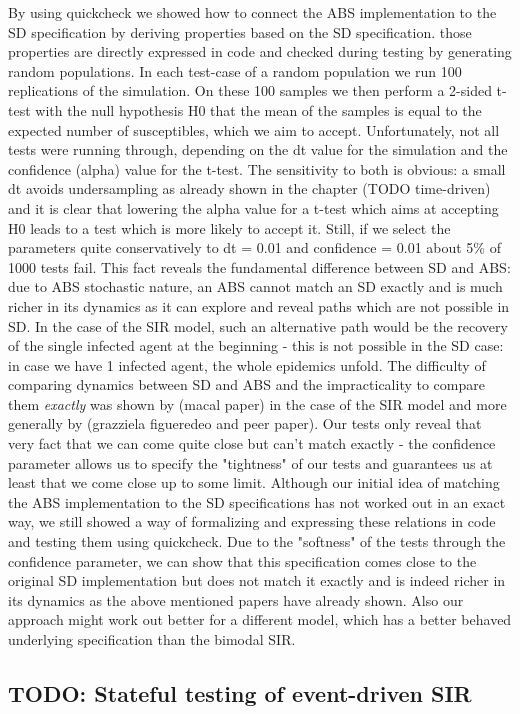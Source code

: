 By using quickcheck we showed how to connect the ABS implementation to the SD specification by deriving properties based on the SD specification. those properties are directly expressed in code and checked during testing by generating random populations. In each test-case of a random population we run 100 replications of the simulation. On these 100 samples we then perform a 2-sided t-test with the null hypothesis H0 that the mean of the samples is equal to the expected number of susceptibles, which we aim to accept.
Unfortunately, not all tests were running through, depending on the dt value for the simulation and the confidence (alpha) value for the t-test. The sensitivity to both is obvious: a small dt avoids undersampling as already shown in the chapter (TODO time-driven) and it is clear that lowering the alpha value for a t-test which aims at accepting H0 leads to a test which is more likely to accept it. Still, if we select the parameters quite conservatively to dt = 0.01 and confidence = 0.01 about 5\% of 1000 tests fail.
This fact reveals the fundamental difference between SD and ABS: due to ABS stochastic nature, an ABS cannot match an SD exactly and is much richer in its dynamics as it can explore and reveal paths which are not possible in SD. In the case of the SIR model, such an alternative path would be the recovery of the single infected agent at the beginning - this is not possible in the SD case: in case we have 1 infected agent, the whole epidemics unfold.
The difficulty of comparing dynamics between SD and ABS and the impracticality to compare them \textit{exactly} was shown by \cite{macal_agent-based_2010} (macal paper) in the case of the SIR model and more generally by \cite{figueredo_comparing_2014} (grazziela figueredeo and peer paper). Our tests only reveal that very fact that we can come quite close but can't match exactly - the confidence parameter allows us to specify the "tightness" of our tests and guarantees us at least that we come close up to some limit.
Although our initial idea of matching the ABS implementation to the SD specifications has not worked out in an exact way, we still showed a way of formalizing and expressing these relations in code and testing them using quickcheck. Due to the "softness" of the tests through the confidence parameter, we can show that this specification comes close to the original SD implementation but does not match it exactly and is indeed richer in its dynamics as the above mentioned papers have already shown.
Also our approach might work out better for a different model, which has a better behaved underlying specification than the bimodal SIR.

\subsection{TODO: Stateful testing of event-driven SIR}